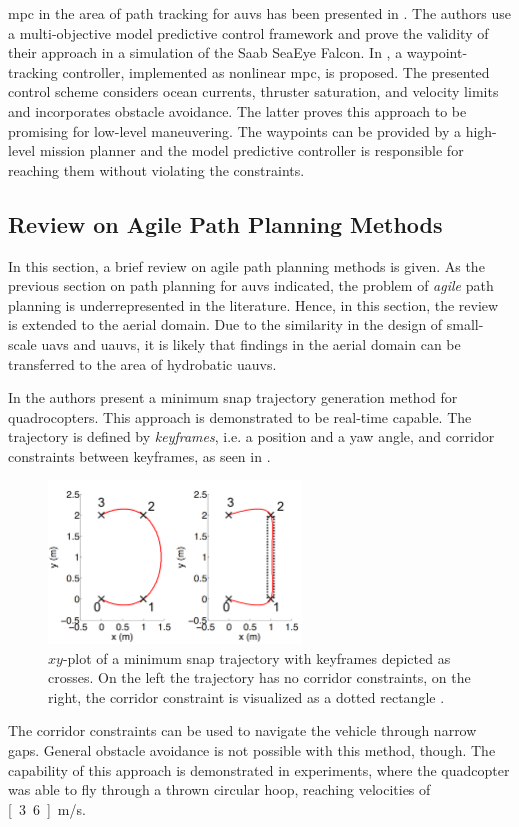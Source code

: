 \ac{mpc} in the area of path tracking for \acp{auv} has been presented in \cite{Shen16}. The authors use a multi-objective model predictive control framework and prove the validity of their approach in a simulation of the Saab SeaEye Falcon. In \cite{Heshmati18}, a waypoint-tracking controller, implemented as nonlinear \ac{mpc}, is proposed. The presented control scheme considers ocean currents, thruster saturation, and velocity limits and incorporates obstacle avoidance. The latter proves this approach to be promising for low-level maneuvering. The waypoints can be provided by a high-level mission planner and the model predictive controller is responsible for reaching them without violating the constraints.



\subsection{Review on Agile Path Planning Methods}
In this section, a brief review on agile path planning methods is given. As the previous section on path planning for \acp{auv} indicated, the problem of \emph{agile} path planning is underrepresented in the literature. Hence, in this section, the review is extended to the aerial domain. Due to the similarity in the design of small-scale \acp{uav} and \acp{uauv}, it is likely that findings in the aerial domain can be transferred to the area of hydrobatic \acp{uauv}.

In \cite{MellingerKumar11} the authors present a minimum snap trajectory generation method for quadrocopters. This approach is demonstrated to be real-time capable. The trajectory is defined by \emph{keyframes}, i.e. a position and a yaw angle, and corridor constraints between keyframes, as seen in .
\begin{figure}
    \centering
    \includegraphics[width=0.6\textwidth]{images/02/mellinger.png}
    \caption{$xy$-plot of a minimum snap trajectory with keyframes depicted as crosses. On the left the trajectory has no corridor constraints, on the right, the corridor constraint is visualized as a dotted rectangle \cite{MellingerKumar11}.}
    \label{fig:mellinger}
\end{figure}
The corridor constraints can be used to navigate the vehicle through narrow gaps. General obstacle avoidance is not possible with this method, though.
The capability of this approach is demonstrated in experiments, where the quadcopter was able to fly through a thrown circular hoop, reaching velocities of \unit[3.6]{m/s}.

